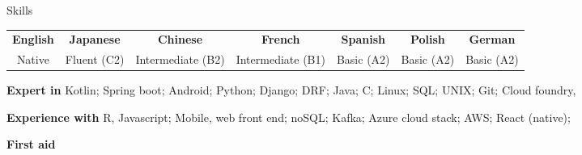 \documentclass[10pt]{resume} %
\begin{document}

\begin{rSection}{Skills}

  \begin{center}
  \begin{tabular}{ c c c c c c c }
   \textbf{English} & \textbf{Japanese} & \textbf{Chinese} & \textbf{French} &
    \textbf{Spanish} & \textbf{Polish} & \textbf{German} \\
    Native & Fluent (C2) & Intermediate (B2) & Intermediate (B1) & Basic (A2) & Basic
    (A2) & Basic (A2)
  \end{tabular}
  \end{center}

  \item \textbf{Expert in}
    Kotlin;
    Spring boot;
    Android;
    Python;
    Django;
    DRF;
    Java;
    C;
    Linux;
    SQL;
    UNIX;
    Git;
    Cloud foundry,


  \item \textbf{Experience with}
    R,
    Javascript;
    Mobile, web front end;
    noSQL;
    Kafka;
    Azure cloud stack;
    AWS;
    React (native);



  \item \textbf{First aid}

\end{rSection}

\end{document}
